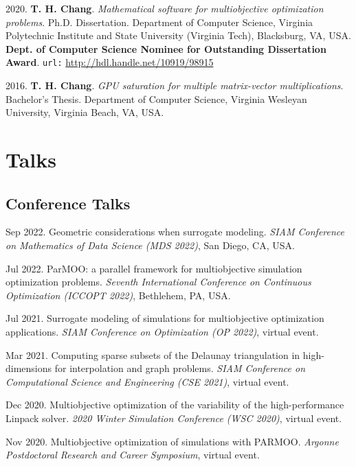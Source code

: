 \documentclass[10pt]{article}
\begin{document}
\medskip

2020. {\bf T. H. Chang}. {\sl Mathematical software for multiobjective optimization problems}. Ph.D. Dissertation. Department of Computer Science, Virginia Polytechnic Institute and State University (Virginia Tech), Blacksburg, VA, USA. {\bf Dept. of Computer Science Nominee for Outstanding Dissertation Award}. {\tt url:} \url{http://hdl.handle.net/10919/98915}

\medskip

2016. {\bf T. H. Chang}. {\sl GPU saturation for multiple matrix-vector multiplications}. Bachelor's Thesis. Department of Computer Science, Virginia Wesleyan University, Virginia Beach, VA, USA. 
\section*{Talks}
\subsection*{Conference Talks}
Sep 2022. Geometric considerations when surrogate modeling. {\sl SIAM Conference on Mathematics of Data Science (MDS 2022)}, San Diego, CA, USA. 

\medskip

Jul 2022. ParMOO: a parallel framework for multiobjective simulation optimization problems. {\sl Seventh International Conference on Continuous Optimization (ICCOPT 2022)}, Bethlehem, PA, USA. 

\medskip

Jul 2021. Surrogate modeling of simulations for multiobjective optimization applications. {\sl SIAM Conference on Optimization (OP 2022)}, virtual event. 

\medskip

Mar 2021. Computing sparse subsets of the Delaunay triangulation in high-dimensions for interpolation and graph problems. {\sl SIAM Conference on Computational Science and Engineering (CSE 2021)}, virtual event. 

\medskip

Dec 2020. Multiobjective optimization of the variability of the high-performance Linpack solver. {\sl 2020 Winter Simulation Conference (WSC 2020)}, virtual event. 

\medskip

Nov 2020. Multiobjective optimization of simulations with PARMOO. {\sl Argonne Postdoctoral Research and Career Symposium}, virtual event. 

\medskip
\end{document}
